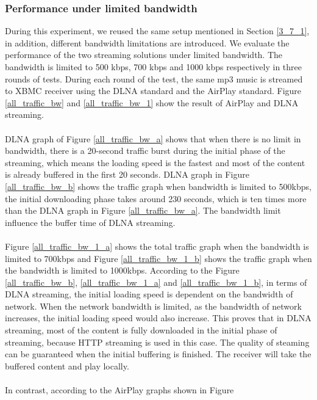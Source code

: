 \subsubsection{Performance under limited bandwidth\label{4_1_2}}
During this experiment, we reused the same setup mentioned in Section \ref{3_7_1}, in addition, different bandwidth limitations are introduced. We evaluate the performance of the two streaming solutions under limited bandwidth. The bandwidth is limited to 500 kbps, 700 kbps and 1000 kbps respectively in three rounds of tests. During each round of the test, the same mp3 music is streamed to XBMC receiver using the DLNA standard and the AirPlay standard. Figure \ref{all_traffic_bw} and \ref{all_traffic_bw_1} show the result of AirPlay and DLNA streaming.\\
\\
DLNA graph of Figure \ref{all_traffic_bw_a} shows that when there is no limit
in bandwidth, there is a 20-second traffic burst during the initial phase of the
streaming, which means the loading speed is the fastest and most of the content is already buffered in the first 20 seconds. DLNA graph in Figure \ref{all_traffic_bw_b} shows the traffic graph when bandwidth is limited to 500kbps, the initial downloading phase takes around 230 seconds, which is ten times more than the DLNA graph in Figure \ref{all_traffic_bw_a}. The bandwidth limit influence the buffer time of DLNA streaming.\\
\\
Figure \ref{all_traffic_bw_1_a} shows the total traffic graph when the bandwidth is limited to 700kbps and Figure \ref{all_traffic_bw_1_b} shows the traffic graph when the bandwidth is limited to 1000kbps. According to the Figure \ref{all_traffic_bw_b}, \ref{all_traffic_bw_1_a} and \ref{all_traffic_bw_1_b}, in terms of DLNA streaming, the initial loading speed is dependent on the bandwidth of network. When the network bandwidth is limited, as the bandwidth of network increases, the initial loading speed would also increase. This proves that in DLNA streaming, most of the content is fully downloaded in the initial phase of streaming, because HTTP streaming is used in this case. The quality of steaming can be guaranteed when the initial buffering is finished. The receiver will take the buffered content and play locally.\\
\\
In contrast, according to the AirPlay graphs shown in Figure
